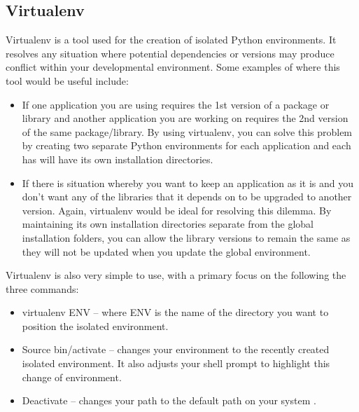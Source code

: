 \subsection{Virtualenv}
Virtualenv is a tool used for the creation of isolated Python environments. It resolves any situation where potential dependencies or versions may produce conflict within your developmental environment. Some examples of where this tool would be useful include:
\begin{itemize}
	\item If one application you are using requires the 1st version of a package or library and another application you are working on requires the 2nd version of the same package/library. By using virtualenv, you can solve this problem by creating two separate Python environments for each application and each has will have its own installation directories.
	\item If there is situation whereby you want to keep an application as it is and you don't want any of the libraries that it depends on to be upgraded to another version. Again, virtualenv would be ideal for resolving this dilemma. By maintaining its own installation directories separate from the global installation folders, you can allow the library versions to remain the same as they will not be updated when you update the global environment. 
\end{itemize}
Virtualenv is also very simple to use, with a primary focus on the following the three commands:
\begin{itemize}
	\item virtualenv ENV – where ENV is the name of the directory you want to position the isolated environment.
	\item Source bin/activate – changes your environment to the recently created isolated environment. It also adjusts your shell prompt to highlight this change of environment.
	\item Deactivate – changes your path to the default path on your system \cite{virtualenv}.
\end{itemize}
